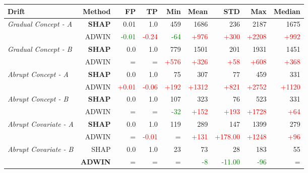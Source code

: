 \documentclass[runningheads]{llncs}
\begin{document}
\begin{figure}[htbp]
\begin{center}
    \begin{tabular}{|l|r|r|r|r|r|r|r|r|}
    \hline
   \textbf{Drift} & \textbf{Method} &  \textbf{FP} & \textbf{TP} & \textbf{Min} & \textbf{Mean} & \textbf{STD} & \textbf{Max} & \textbf{Median} \\
    \hline
    
    
\textit{Gradual Concept - A} & \textbf{SHAP} &                     0.01 &                    1.0 &                    459 &                  1686 &                      236 &                   2187 &                  1675 \\ \cline{2-9} {} & ADWIN &  \textcolor{green}{-0.01} &  \textcolor{red}{-0.24} &  \textcolor{green}{-64} &  \textcolor{red}{+976} &  \textcolor{red}{+300} &  \textcolor{red}{+2208} &  \textcolor{red}{+992} \\ \hline
 \textit{Gradual Concept - B} & \textbf{SHAP} &  0.0 &  1.0 &                   779 &                  1501 &                     201 &                  1931 &                  1451 \\ \cline{2-9} {} & ADWIN & =\; & =\; &  \textcolor{red}{+576} &  \textcolor{red}{+326} &  \textcolor{red}{+58} &  \textcolor{red}{+608} &  \textcolor{red}{+368} \\ \hline\hline
 
 \textit{Abrupt Concept - A} & \textbf{SHAP} &                    0.0 &                    1.0 &                    75 &                    307 &                       77 &                    459 &                    331 \\ \cline{2-9} {} & ADWIN &  \textcolor{red}{+0.01} &  \textcolor{red}{-0.06} &  \textcolor{red}{+192} &  \textcolor{red}{+1312} &  \textcolor{red}{+821} &  \textcolor{red}{+2752} &  \textcolor{red}{+1120} \\ \hline
 \textit{Abrupt Concept - B} & \textbf{SHAP} &  0.0 &  1.0 &                    107 &                   323 &                       76 &                    523 &                  331 \\ \cline{2-9} {} & ADWIN & =\; & =\; &  \textcolor{green}{-32} &  \textcolor{red}{+152} &  \textcolor{red}{+193} &  \textcolor{red}{+1728} &  \textcolor{red}{+64} \\ \hline\hline
 
 \textit{Abrupt Covariate - A} & \textbf{SHAP} &  0.0 &                    1.0 &  119 &                   289 &                      147 &                   1399 &                  279 \\ \cline{2-9} {} & ADWIN & =\; &  \textcolor{red}{-0.01} & =\; &  \textcolor{red}{+131} &  \textcolor{red}{+178.00} &  \textcolor{red}{+1248} &  \textcolor{red}{+96} \\ \hline
 \textit{Abrupt Covariate - B} & SHAP &  0.0 &  1.0 &   23 &                    73 &                        28 &                    183 &     55 \\ \cline{2-9} {} & \textbf{ADWIN} & =\; & =\; & =\; &  \textcolor{green}{-8} &  \textcolor{green}{-11.00} &  \textcolor{green}{-96} &   =\; \\ \hline\hline
 

\end{tabular}
\end{center}
\end{figure}
\end{document}
